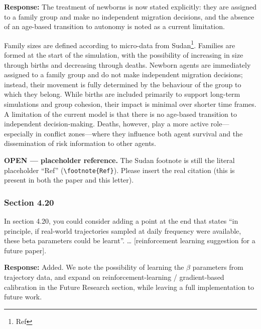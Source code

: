 \documentclass[11pt,a4paper]{article}
\begin{document}
\textbf{Response:} The treatment of newborns is now stated explicitly: they are assigned to a family group and
make no independent migration decisions, and the absence of an age-based transition to autonomy is noted as a
current limitation.

\vspace{0.3cm}
\begin{updatebox}
Family sizes are defined according to micro-data from Sudan\footnote{Ref}. Families are formed at the start of the
simulation, with the possibility of increasing in size through births and decreasing through deaths. Newborn agents
are immediately assigned to a family group and do not make independent migration decisions; instead, their movement
is fully determined by the behaviour of the group to which they belong. While births are included primarily to support
long-term simulations and group cohesion, their impact is minimal over shorter time frames. A limitation of the current
model is that there is no age-based transition to independent decision-making. Deaths, however, play a more active
role---especially in conflict zones---where they influence both agent survival and the dissemination of risk
information to other agents.
\end{updatebox}

\vspace{0.2cm}
\begin{flagbox}
\textbf{OPEN --- placeholder reference.} The Sudan footnote is still the literal placeholder ``Ref''
(\texttt{\textbackslash footnote\{Ref\}}). Please insert the real citation (this is present in both the paper
and this letter).
\end{flagbox}

\subsubsection*{Section 4.20}

\begin{reviewbox}
In section 4.20, you could consider adding a point at the end that states ``in principle, if real-world trajectories sampled at daily frequency were available, these beta parameters could be learnt''. \ldots{} [reinforcement learning suggestion for a future paper].
\end{reviewbox}

\textbf{Response:} Added. We note the possibility of learning the $\beta$ parameters from trajectory data, and
expand on reinforcement-learning / gradient-based calibration in the Future Research section, while leaving a
full implementation to future work.
\end{document}
